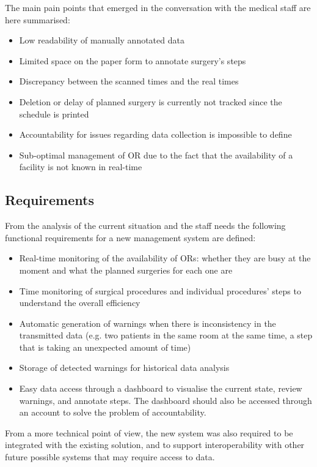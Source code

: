 The main pain points that emerged in the conversation with the medical staff are here summarised:
\begin{itemize}
    \item Low readability of manually annotated data
    \item Limited space on the paper form to annotate surgery's steps
    \item Discrepancy between the scanned times and the real times
    \item Deletion or delay of planned surgery is currently not tracked since the schedule is printed
    \item Accountability for issues regarding data collection is impossible to define
    \item Sub-optimal management of OR due to the fact that the availability of a facility is not known in real-time
\end{itemize}

\subsection{Requirements}
From the analysis of the current situation and the staff needs the following functional requirements for a new management system are defined:
\begin{itemize}
    \item Real-time monitoring of the availability of ORs: whether they are busy at the moment and what the planned surgeries for each one are
    \item Time monitoring of surgical procedures and individual procedures' steps to understand the overall efficiency
    \item Automatic generation of warnings when there is inconsistency in the transmitted data (e.g. two patients in the same room at the same time, a step that is taking an unexpected amount of time)
    \item Storage of detected warnings for historical data analysis
    \item Easy data access through a dashboard to visualise the current state, review warnings, and annotate steps. The dashboard should also be accessed through an account to solve the problem of accountability.
\end{itemize}

From a more technical point of view, the new system was also required to be integrated with the existing solution, and to support interoperability with other future possible systems that may require access to data.

